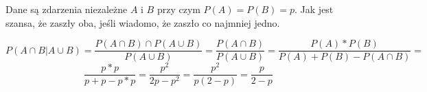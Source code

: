 \medskip 
{}  
\medskip

Dane są zdarzenia niezależne $A$ i $B$ przy czym $P(A) = P(B) = p$. Jak jest szansa, że zaszły oba, jeśli wiadomo, że zaszło co najmniej jedno.

$$
P(A \cap B | A \cup B ) =  \frac {P(A \cap B ) \cap P ( A \cup B)} { P ( A \cup B)} = 
\frac {P(A \cap B )} { P ( A \cup B)} =  
\frac {P(A) * P (B)} {P(A) + P (B) - P ( A \cap B)} = 
$$
$$
\frac {p * p} {p + p - p * p} = \frac {p ^ {2} }{2p - p ^{2}} = 
\frac {p ^{2}} {p( 2 - p) } = 
\frac {p} { 2 - p } 
$$
